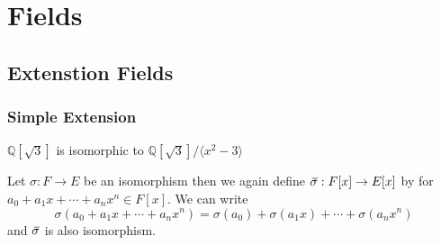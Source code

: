 \chapter{Fields}

\section{Extenstion Fields}

\subsection{Simple Extension}

\begin{example}
    $\mathbb{Q}[\sqrt{3}]$ is isomorphic to $\mathbb{Q}[\sqrt{3}]/\langle x^2 - 3 \rangle$
\end{example}

Let $\sigma: F \to E$ be an isomorphism then we again define 
$\,\overline{\!{\sigma}} : F[x] \to E[x]$ by for $a_0 + a_1x + \cdots + a_n x^n \in F[x]$. We can write 
\begin{equation}
    \sigma (a_0 + a_1x + \cdots + a_n x^n) = \sigma(a_0) + \sigma(a_1x) + \cdots + \sigma(a_n x^n)
\end{equation}
and $\,\overline{\!{\sigma}}$ is also isomorphism.


